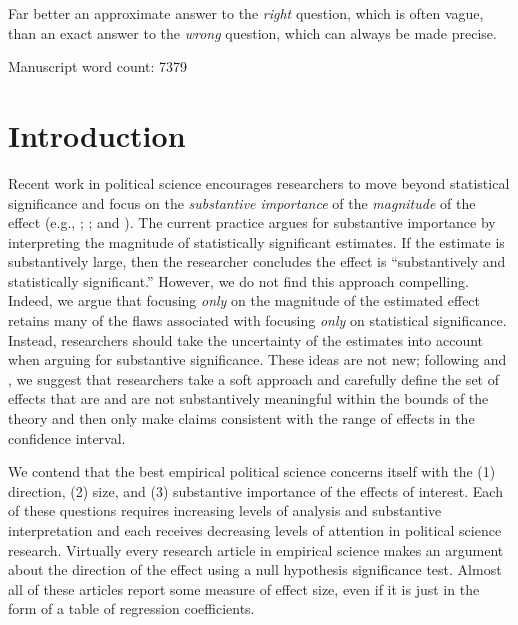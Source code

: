 \documentclass[12pt]{article}
\begin{document}
\epigraph{Far better an approximate answer to the \textit{right} question, which is often vague, than an exact answer to the \textit{wrong} question, which can always be made precise.}{\citet[pp. 13-14]{Tukey1962}}

Manuscript word count: 7379

\thispagestyle{empty}

\newpage
\doublespace

\section*{Introduction}

Recent work in political science encourages researchers to move beyond statistical significance and focus on the \emph{substantive importance} of the \emph{magnitude} of the effect (e.g., \citealt{KingTomzWittenberg2000}; \citealt{HanmerKalkan2013}; and \citealt{EsareyDanneman2014}). The current practice argues for substantive importance by interpreting the magnitude of statistically significant estimates. If the estimate is substantively large, then the researcher concludes the effect is ``substantively and statistically significant.'' However, we do not find this approach compelling. Indeed, we argue that focusing \emph{only} on the magnitude of the estimated effect retains many of the flaws associated with focusing \emph{only} on statistical significance. Instead, researchers should take the uncertainty of the estimates into account when arguing for substantive significance. These ideas are not new; following \cite{Gross2014} and \cite{Rainey2014}, we suggest that researchers take a soft approach and carefully define the set of effects that are and are not substantively meaningful within the bounds of the theory and then only make claims consistent with the range of effects in the confidence interval.

We contend that the best empirical political science concerns itself with the (1) direction, (2) size, and (3) substantive importance of the effects of interest. Each of these questions requires increasing levels of analysis and substantive interpretation and each receives decreasing levels of attention in political science research. Virtually every research article in empirical science makes an argument about the direction of the effect using a null hypothesis significance test. Almost all of these articles report some measure of effect size, even if it is just in the form of a table of regression coefficients. 
\end{document}
